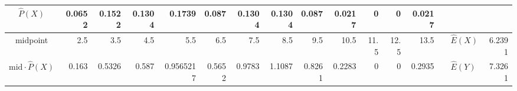 \begin{table}[ht]
\begin{adjustbox}{width = \textwidth, center}
\begin{tabular}{|cc|r|r|r|r|r|r|r|r|r|r|r|r|r|r|r|}
            \multicolumn{2}{|c|}{\cellcolor[HTML]{FFF2CC}$\widehat{P}(X)$}                  & \cellcolor[HTML]{FFF2CC}0.0652                 & \cellcolor[HTML]{FFF2CC}0.1522                 & \cellcolor[HTML]{FFF2CC}0.1304                 & \cellcolor[HTML]{FFF2CC}0.1739                 & \cellcolor[HTML]{FFF2CC}0.087                  & \cellcolor[HTML]{FFF2CC}0.1304                 & \cellcolor[HTML]{FFF2CC}0.1304                 & \cellcolor[HTML]{FFF2CC}0.087                   & \cellcolor[HTML]{FFF2CC}0.0217                  & \cellcolor[HTML]{FFF2CC}0                       & \cellcolor[HTML]{FFF2CC}0                       & \cellcolor[HTML]{FFF2CC}0.0217                  & \multicolumn{1}{l|}{}                                                           & \multicolumn{1}{l|}{}                                                   & \multicolumn{1}{l|}{}                                                                 \\ \hline
            \multicolumn{2}{|c|}{\cellcolor[HTML]{FFF2CC}midpoint}                          & \cellcolor[HTML]{FFF2CC}2.5                    & \cellcolor[HTML]{FFF2CC}3.5                    & \cellcolor[HTML]{FFF2CC}4.5                    & \cellcolor[HTML]{FFF2CC}5.5                    & \cellcolor[HTML]{FFF2CC}6.5                    & \cellcolor[HTML]{FFF2CC}7.5                    & \cellcolor[HTML]{FFF2CC}8.5                    & \cellcolor[HTML]{FFF2CC}9.5                     & \cellcolor[HTML]{FFF2CC}10.5                    & \cellcolor[HTML]{FFF2CC}11.5                    & \cellcolor[HTML]{FFF2CC}12.5                    & \cellcolor[HTML]{FFF2CC}13.5                    & \multicolumn{1}{l|}{}                                                           & \multicolumn{1}{l|}{\cellcolor[HTML]{E6B8AF}$\widehat{E}(X)$}           & \cellcolor[HTML]{E6B8AF}6.2391                                                        \\ \hline
            \multicolumn{2}{|c|}{\cellcolor[HTML]{FFF2CC}$\mathrm{mid}\cdot\widehat{P}(X)$} & \cellcolor[HTML]{FFF2CC}0.163                  & \cellcolor[HTML]{FFF2CC}0.5326                 & \cellcolor[HTML]{FFF2CC}0.587                  & \cellcolor[HTML]{FFF2CC}0.9565217              & \cellcolor[HTML]{FFF2CC}0.5652                 & \cellcolor[HTML]{FFF2CC}0.9783                 & \cellcolor[HTML]{FFF2CC}1.1087                 & \cellcolor[HTML]{FFF2CC}0.8261                  & \cellcolor[HTML]{FFF2CC}0.2283                  & \cellcolor[HTML]{FFF2CC}0                       & \cellcolor[HTML]{FFF2CC}0                       & \cellcolor[HTML]{FFF2CC}0.2935                  & \multicolumn{1}{l|}{}                                                           & \multicolumn{1}{l|}{\cellcolor[HTML]{E6B8AF}$\widehat{E}(Y)$}           & \cellcolor[HTML]{E6B8AF}7.3261                                                        \\ \hline
        \end{tabular}
    \end{adjustbox}
\end{table}\\
